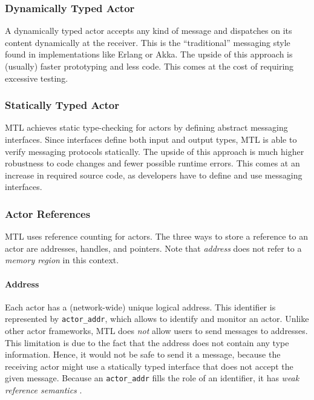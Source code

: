 \subsubsection{Dynamically Typed Actor}

A dynamically typed actor accepts any kind of message and dispatches on its
content dynamically at the receiver. This is the ``traditional'' messaging
style found in implementations like Erlang or Akka. The upside of this approach
is (usually) faster prototyping and less code. This comes at the cost of
requiring excessive testing.

\subsubsection{Statically Typed Actor}

MTL achieves static type-checking for actors by defining abstract messaging
interfaces. Since interfaces define both input and output types, MTL is able to
verify messaging protocols statically. The upside of this approach is much
higher robustness to code changes and fewer possible runtime errors. This comes
at an increase in required source code, as developers have to define and use
messaging interfaces.

\subsubsection{Actor References}
\label{actor-reference}

MTL uses reference counting for actors. The three ways to store a reference to
an actor are addresses, handles, and pointers. Note that \emph{address} does
not refer to a \emph{memory region} in this context.

\paragraph{Address}
\label{actor-address}

Each actor has a (network-wide) unique logical address. This identifier is
represented by \lstinline^actor_addr^, which allows to identify and monitor an
actor. Unlike other actor frameworks, MTL does \emph{not} allow users to send
messages to addresses. This limitation is due to the fact that the address does
not contain any type information. Hence, it would not be safe to send it a
message, because the receiving actor might use a statically typed interface
that does not accept the given message. Because an \lstinline^actor_addr^ fills
the role of an identifier, it has \emph{weak reference semantics}
.

